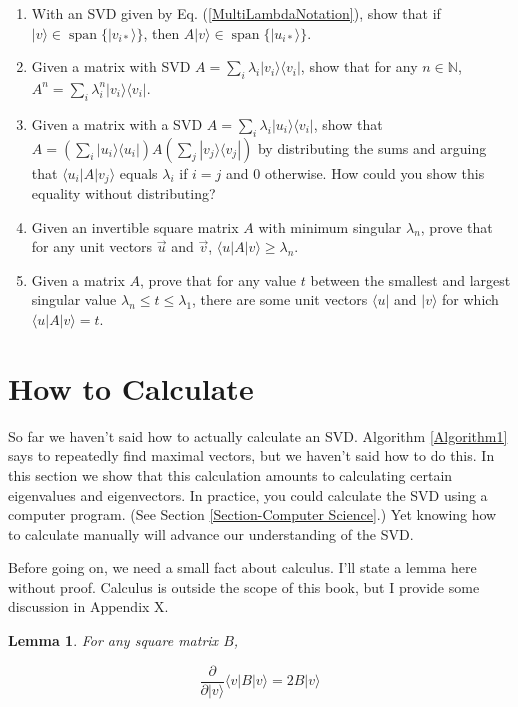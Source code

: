 \documentclass{amsbook}
\newtheorem{lemma}[theorem]{Lemma}
\begin{document}
\begin{enumerate}
\item With an SVD given by Eq. (\ref{MultiLambdaNotation}), show that if $|v\rangle\in\operatorname{span}\{|v_{i*}\rangle\}$, then $A|v\rangle\in\operatorname{span}\{|u_{i*}\rangle\}$.
\item Given a matrix with SVD $A=\sum_i\lambda_i|v_i\rangle\langle v_i|$, show that for any $n\in\mathbb N$, $A^n=\sum_i\lambda_i^n|v_i\rangle\langle v_i|$.
\item Given a matrix with a SVD $A=\sum_i\lambda_i|u_i\rangle\langle v_i|$, show that $A=\left(\sum_i|u_i\rangle\langle u_i|\right)A\left(\sum_j|v_j\rangle\langle v_j|\right)$ by distributing the sums and arguing that $\langle u_i|A|v_j\rangle$ equals $\lambda_i$ if $i=j$ and $0$ otherwise.  How could you show this equality without distributing?
\item Given an invertible square matrix $A$ with minimum singular $\lambda_n$, prove that for any unit vectors $\vec u$ and $\vec v$, $\langle u|A|v\rangle\geq\lambda_n$.
\item Given a matrix $A$, prove that for any value $t$ between the smallest and largest singular value $\lambda_n\leq t\leq\lambda_1$, there are some unit vectors $\langle u|$ and $|v\rangle$ for which $\langle u|A|v\rangle=t$.
\end{enumerate}

\section{How to Calculate}\label{Section-How to Calculate}

So far we haven't said how to actually calculate an SVD.  Algorithm \ref{Algorithm1} says to repeatedly find maximal vectors, but we haven't said how to do this.  In this section we show that this calculation amounts to calculating certain eigenvalues and eigenvectors.  In practice, you could calculate the SVD using a computer program.  (See Section \ref{Section-Computer Science}.)  Yet knowing how to calculate manually will advance our understanding of the SVD.

Before going on, we need a small fact about calculus.  I'll state a lemma here without proof.  Calculus is outside the scope of this book, but I provide some discussion in Appendix X.

\begin{lemma}
\label{CalculusLemma}
For any square matrix $B$,

$$
\frac{\partial}{\partial|v\rangle}\langle v|B|v\rangle = 2B|v\rangle
$$
\end{lemma}
\end{document}
